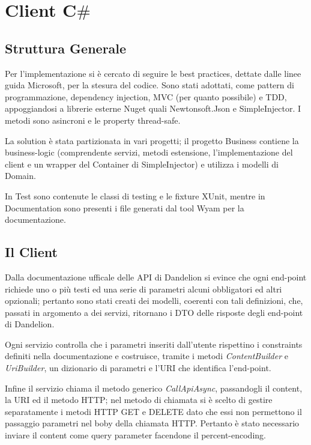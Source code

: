 
\chapter{Client C$\#$}
\section{Struttura Generale}

Per l'implementazione si è cercato di seguire le best practices, dettate dalle linee guida Microsoft, per la stesura del codice.
Sono stati adottati, come pattern di programmazione, dependency injection, MVC (per quanto possibile) e TDD, appoggiandosi a librerie esterne Nuget quali 
Newtonsoft.Json e SimpleInjector. I metodi sono asincroni e le property thread-safe.

La solution è stata partizionata in vari progetti; il progetto Business contiene la business-logic 
(comprendente servizi, metodi estensione, l'implementazione del client e un wrapper del Container di SimpleInjector) e utilizza i modelli di Domain.

In Test sono contenute le classi di testing e le fixture XUnit, mentre in Documentation sono presenti i file generati dal tool Wyam per la documentazione.

\section{Il Client}

Dalla documentazione ufficale delle API di Dandelion si evince che ogni end-point richiede uno o più testi ed una serie di parametri alcuni obbligatori ed altri 
opzionali; 
pertanto sono stati creati dei modelli, coerenti con tali definizioni, che, passati in argomento a dei servizi, ritornano i DTO delle risposte degli end-point di Dandelion.

Ogni servizio controlla che i parametri inseriti dall'utente rispettino i constraints definiti nella documentazione e costruisce, tramite i metodi \textit{ContentBuilder} e  
\textit{UriBuilder}, un dizionario di parametri e l'URI che identifica l'end-point. 

Infine il servizio chiama il metodo generico \textit{CallApiAsync}, passandogli il content, la URI ed il metodo HTTP; 
nel metodo di chiamata si è scelto di gestire separatamente i metodi HTTP GET e DELETE dato che essi non permettono il passaggio parametri nel boby 
della chiamata HTTP. Pertanto è stato necessario inviare il content come query parameter facendone il percent-encoding.

